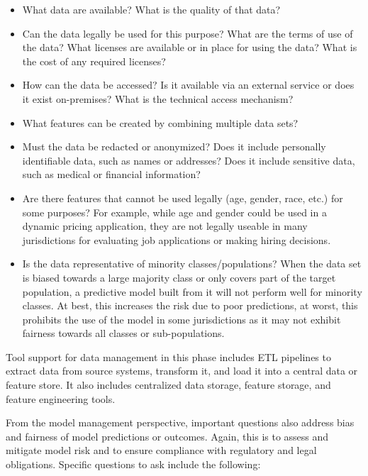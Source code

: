 \begin{itemize}
   \item What data are available? What is the quality of that data?
   \item Can the data legally be used for this purpose? What are the terms of use of the data? What licenses are available or in place for using the data? What is the cost of any required licenses?
   \item How can the data be accessed? Is it available via an external service or does it exist on-premises? What is the technical access mechanism?
   \item What features can be created by combining multiple data sets?
   \item Must the data be redacted or anonymized? Does it include personally identifiable data, such as names or addresses? Does it include sensitive data, such as medical or financial information?
   \item Are there features that cannot be used legally (age, gender, race, etc.) for some purposes? For example, while age and gender could be used in a dynamic pricing application, they are not legally useable in many jurisdictions for evaluating job applications or making hiring decisions. 
   \item Is the data representative of minority classes/populations? When the data set is biased towards a large majority class or only covers part of the target population, a predictive model built from it will not perform well for minority classes. At best, this increases the risk due to poor predictions, at worst, this prohibits the use of the model in some jurisdictions as it may not exhibit fairness towards all classes or sub-populations.
\end{itemize}

Tool support for data management in this phase includes ETL pipelines to extract data from source systems, transform it, and load it into a central data or feature store. It also includes centralized data storage, feature storage, and feature engineering tools. 

From the model management perspective, important questions also address bias and fairness of model predictions or outcomes. Again, this is to assess and mitigate model risk and to ensure compliance with regulatory and legal obligations. Specific questions to ask include the following:

